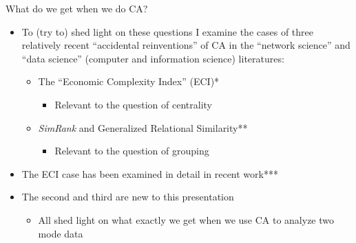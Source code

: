 \documentclass[
  ignorenonframetext,
]{beamer}
\providecommand{\tightlist}{%
  \setlength{\itemsep}{0pt}\setlength{\parskip}{0pt}}\usepackage{longtable,booktabs,array}
\begin{document}
\begin{frame}{What do we get when we do CA?}
\protect\hypertarget{what-do-we-get-when-we-do-ca-1}{}
\begin{itemize}
\tightlist
\item
  To (try to) shed light on these questions I examine the cases of three
  relatively recent ``accidental reinventions'' of CA in the ``network
  science'' and ``data science'' (computer and information science)
  literatures:

  \begin{itemize}
  \tightlist
  \item
    The ``Economic Complexity Index'' (ECI)*

    \begin{itemize}
    \tightlist
    \item
      Relevant to the question of centrality
    \end{itemize}
  \item
    \emph{SimRank} and Generalized Relational Similarity**

    \begin{itemize}
    \tightlist
    \item
      Relevant to the question of grouping
    \end{itemize}
  \end{itemize}
\item
  The ECI case has been examined in detail in recent work***
\item
  The second and third are new to this presentation

  \begin{itemize}
  \tightlist
  \item
    All shed light on what exactly we get when we use CA to analyze two
    mode data
  \end{itemize}
\end{itemize}

\end{frame}
\end{document}
